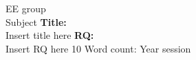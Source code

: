 \begin{titlepage}
\begin{center}
EE group\\
Subject
\vspace*{4cm}
\textbf{Title:}\\
Insert title here
\vspace{1cm}
\textbf{RQ:}\\
Insert RQ here
\vspace{4cm}
10
Word count:
\vfill
\vspace{0.1cm}
Year session
\end{center}
\end{titlepage}